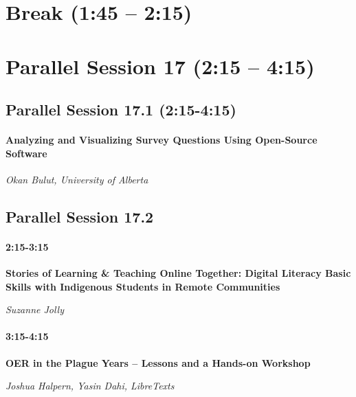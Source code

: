 \documentclass[
]{book}
\begin{document}
\hypertarget{break-145-215-4}{%
\section*{Break (1:45 -- 2:15)}\label{break-145-215-4}}

\hypertarget{parallel-session-17-215-415}{%
\section*{Parallel Session 17 (2:15 -- 4:15)}\label{parallel-session-17-215-415}}

\hypertarget{parallel-session-17.1-215-415}{%
\subsection*{Parallel Session 17.1 (2:15-4:15)}\label{parallel-session-17.1-215-415}}

\begin{todo}
\hypertarget{analyzing-and-visualizing-survey-questions-using-open-source-software}{%
\paragraph{Analyzing and Visualizing Survey Questions Using Open-Source
Software}\label{analyzing-and-visualizing-survey-questions-using-open-source-software}}

\emph{Okan Bulut, University of Alberta}
\end{todo}

\hypertarget{parallel-session-17.2}{%
\subsection*{Parallel Session 17.2}\label{parallel-session-17.2}}

\begin{todo}
\hypertarget{section}{%
\paragraph{2:15-3:15}\label{section}}

\textbf{Stories of Learning \& Teaching Online Together: Digital
Literacy Basic Skills with Indigenous Students in Remote Communities}

\emph{Suzanne Jolly}
\end{todo}
\begin{todo}
\hypertarget{section}{%
\paragraph{3:15-4:15}\label{section}}

\textbf{OER in the Plague Years -- Lessons and a Hands-on Workshop}

\emph{Joshua Halpern, Yasin Dahi, LibreTexts}
\end{todo}
\end{document}
